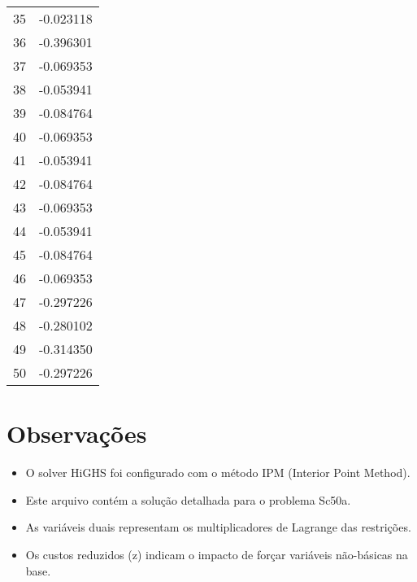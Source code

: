 \documentclass[12pt]{article}
\begin{document}
\begin{longtable}{@{}cc@{}}
35 & -0.023118 \\
36 & -0.396301 \\
37 & -0.069353 \\
38 & -0.053941 \\
39 & -0.084764 \\
40 & -0.069353 \\
41 & -0.053941 \\
42 & -0.084764 \\
43 & -0.069353 \\
44 & -0.053941 \\
45 & -0.084764 \\
46 & -0.069353 \\
47 & -0.297226 \\
48 & -0.280102 \\
49 & -0.314350 \\
50 & -0.297226 \\

\end{longtable}


\section{Observações}

\begin{itemize}
\item O solver HiGHS foi configurado com o método IPM (Interior Point Method).
\item Este arquivo contém a solução detalhada para o problema Sc50a.
\item As variáveis duais representam os multiplicadores de Lagrange das restrições.
\item Os custos reduzidos (z) indicam o impacto de forçar variáveis não-básicas na base.
\end{itemize}
\end{document}
